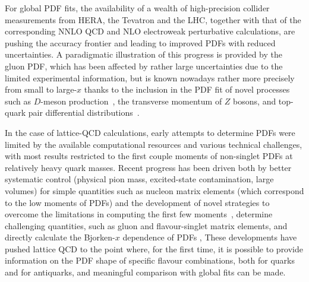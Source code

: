 
%
For global PDF fits, the availability of a wealth of high-precision collider measurements
from HERA, the Tevatron and the LHC, together with that of the corresponding
NNLO QCD and NLO electroweak perturbative calculations, are pushing the
accuracy frontier and leading to improved PDFs with reduced uncertainties.
A paradigmatic illustration of this progress is provided by the gluon PDF, which has been
affected by rather large uncertainties due to the limited experimental
information, but is known nowadays rather more precisely from small to large-$x$
thanks to the inclusion in the
PDF fit of novel processes such as $D$-meson production~\cite{Gauld:2016kpd},
the transverse momentum of $Z$ bosons, and top-quark pair differential
distributions~\cite{Czakon:2016olj}. 

In the case of lattice-QCD calculations, early attempts to determine PDFs were limited by the 
available computational resources and various technical challenges, with most results restricted to
the first couple moments of non-singlet PDFs at relatively heavy quark masses. Recent progress has been driven both
by better systematic control (physical pion mass, excited-state contamination, large volumes) 
for simple quantities such as nucleon matrix elements (which correspond to the low moments of PDFs) and the development of novel
strategies to overcome the limitations in computing the first few 
moments~\cite{Constantinou:2014tga,Syritsyn:2014saa,Lin:2012ev}, determine challenging quantities, 
such as gluon and flavour-singlet matrix elements, and directly calculate the Bjorken-$x$ dependence of PDFs \cite{Lin:2014zya,Alexandrou:2015rja,Chen:2016utp,Alexandrou:2016jqi},
These developments have pushed lattice QCD to the point where, for the first time, it is possible to provide information on the PDF shape
of specific flavour combinations, both for quarks and for antiquarks, and meaningful comparison with 
global fits can be made.

